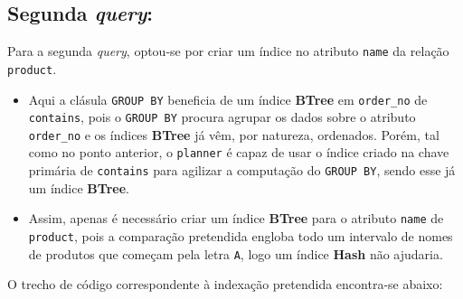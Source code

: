 \documentclass[12pt,a4paper]{article}
\begin{document}


\subsection*{Segunda \textit{query}:}



Para a segunda \textit{query}, optou-se por criar um índice no atributo \texttt{name} da relação
\texttt{product}.

\vspace*{0.25cm}

\begin{itemize}
  \item Aqui a clásula \texttt{GROUP BY} beneficia de um índice \textbf{BTree} em \texttt{order\_no} de
        \texttt{contains}, pois o \texttt{GROUP BY} procura agrupar os dados sobre o atributo \texttt{order\_no}
        e os índices \textbf{BTree} já vêm, por natureza, ordenados.
        Porém, tal como no ponto anterior, o \texttt{planner} é capaz de usar o índice criado
        na chave primária de \texttt{contains} para agilizar a computação do \texttt{GROUP BY}, sendo
        esse já um índice \textbf{BTree}.

  \item Assim, apenas é necessário criar um índice \textbf{BTree} para o atributo \texttt{name}
        de \texttt{product}, pois a comparação pretendida engloba todo um intervalo de nomes
        de produtos que começam pela letra \texttt{A}, logo um índice \textbf{Hash} não ajudaria.
\end{itemize}

O trecho de código correspondente à indexação pretendida encontra-se abaixo:


\end{document}
